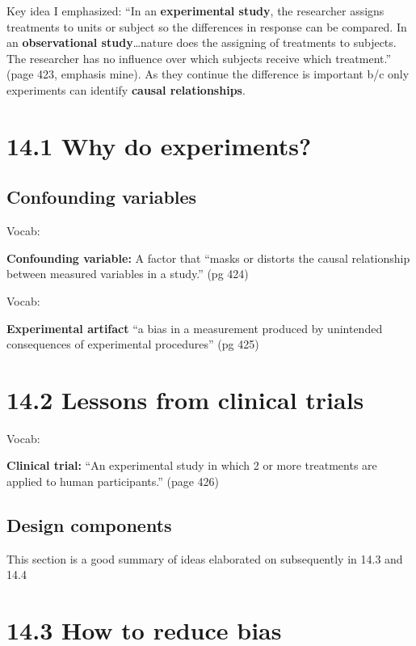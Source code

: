 \documentclass[]{book}
\theoremstyle{definition}
\theoremstyle{definition}
\theoremstyle{definition}
\theoremstyle{remark}
\begin{document}
Key idea I emphasized: ``In an \textbf{experimental study}, the
researcher assigns treatments to units or subject so the differences in
response can be compared. In an \textbf{observational
study}\ldots{}nature does the assigning of treatments to subjects. The
researcher has no influence over which subjects receive which
treatment.'' (page 423, emphasis mine). As they continue the difference
is important b/c only experiments can identify \textbf{causal
relationships}.

\section{14.1 Why do experiments?}\label{why-do-experiments}

\subsection{Confounding variables}\label{confounding-variables}

Vocab:

\textbf{Confounding variable:} A factor that ``masks or distorts the
causal relationship between measured variables in a study.'' (pg 424)

Vocab:

\textbf{Experimental artifact} ``a bias in a measurement produced by
unintended consequences of experimental procedures'' (pg 425)

\section{14.2 Lessons from clinical
trials}\label{lessons-from-clinical-trials}

Vocab:

\textbf{Clinical trial:} ``An experimental study in which 2 or more
treatments are applied to human participants.'' (page 426)

\subsection{Design components}\label{design-components}

This section is a good summary of ideas elaborated on subsequently in
14.3 and 14.4

\section{14.3 How to reduce bias}\label{how-to-reduce-bias}
\end{document}
